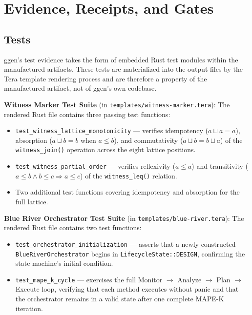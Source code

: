 
\section{Evidence, Receipts, and Gates}
\label{sec:ggen-evidence}

\subsection{Tests}
\label{sec:ggen-evidence-tests}

ggen's test evidence takes the form of embedded Rust test modules within the manufactured
artifacts. These tests are materialized into the output files by the Tera template rendering
process and are therefore a property of the manufactured artifact, not of ggen's own codebase.

\textbf{Witness Marker Test Suite} (in \texttt{templates/witness-marker.tera}): The rendered
Rust file contains three passing test functions:
\begin{itemize}
  \item \texttt{test\_witness\_lattice\_monotonicity} --- verifies idempotency ($a \sqcup a = a$),
    absorption ($a \sqcup b = b$ when $a \leq b$), and commutativity ($a \sqcup b = b \sqcup a$)
    of the \texttt{witness\_join()} operation across the eight lattice positions.
  \item \texttt{test\_witness\_partial\_order} --- verifies reflexivity ($a \leq a$) and
    transitivity ($a \leq b \land b \leq c \Rightarrow a \leq c$) of the \texttt{witness\_leq()}
    relation.
  \item Two additional test functions covering idempotency and absorption for the full lattice.
\end{itemize}

\textbf{Blue River Orchestrator Test Suite} (in \texttt{templates/blue-river.tera}): The
rendered Rust file contains two test functions:
\begin{itemize}
  \item \texttt{test\_orchestrator\_initialization} --- asserts that a newly constructed
    \texttt{BlueRiverOrchestrator} begins in \texttt{LifecycleState::DESIGN}, confirming the
    state machine's initial condition.
  \item \texttt{test\_mape\_k\_cycle} --- exercises the full Monitor $\to$ Analyze $\to$ Plan
    $\to$ Execute loop, verifying that each method executes without panic and that the
    orchestrator remains in a valid state after one complete MAPE-K iteration.
\end{itemize}

